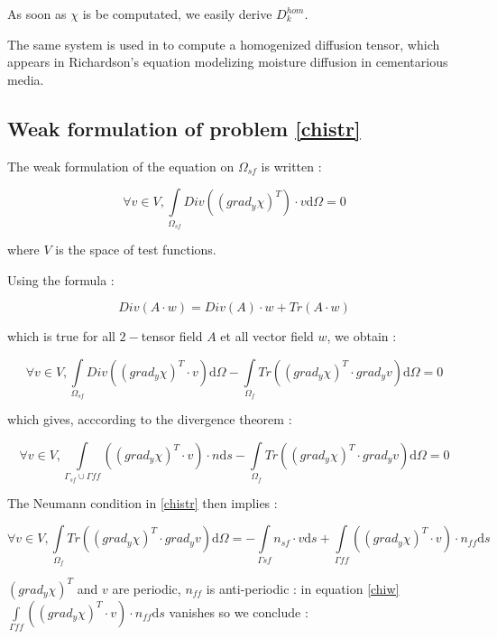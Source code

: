 As soon as $\chi$ is be computated, we easily derive $D_k^{hom}$.

\ligneinter
The same system is used in \cite{WalMill16} to compute a homogenized diffusion tensor, %
which appears in Richardson's equation modelizing moisture diffusion in cementarious media.

\subsection{Weak formulation of problem \ref{chistr}}

The weak formulation of the equation on $\Omega_{sf}$ is written :

\[\forall v \in V , \int\limits_{\Omega_{sf}}Div\left(\left(grad_y \chi\right)^{T}\right)\cdot v\text{d}\Omega=0\]

where $V$ is the space of test functions.

\par
Using the formula :

\[Div(A\cdot w)=Div(A)\cdot w+Tr(A\cdot w)\]

which is true for all $2-$tensor field $A$ et all vector field $w$, we obtain :

\[\forall v \in V , \int\limits_{\Omega_{sf}}Div\left(\left(grad_y \chi\right)^{T}\cdot v\right)\text{d}\Omega-%
\int\limits_{\Omega_f}Tr\left(\left(grad_y\chi\right)^T\cdot grad_y v\right)\text{d}\Omega=0\]

which gives, acccording to the divergence theorem :

\[\forall v \in V , \int\limits_{\Gamma_{sf}\cup\Gamma{ff}}\left(\left(grad_y \chi\right)^{T}\cdot v\right)\cdot n\text{d}s-%
\int\limits_{\Omega_f}Tr\left(\left(grad_y\chi\right)^T\cdot grad_y v\right)\text{d}\Omega=0\]

The Neumann condition in \ref{chistr} then implies :

\begin{equation}\label{chiw}
\forall v \in V , %
\int\limits_{\Omega_f}Tr\left(\left(grad_y\chi\right)^T\cdot grad_y v\right)\text{d}\Omega=%
-\int\limits_{\Gamma{sf}}n_{sf}\cdot v\text{d}s%
+\int\limits_{\Gamma{ff}}\left(\left(grad_y \chi\right)^{T}\cdot v\right)\cdot n_{ff}\text{d}s
\end{equation}

$\left(grad_y \chi\right)^{T}$ and $v$ are periodic, $n_{ff}$ is anti-periodic : %
in equation \ref{chiw} $\displaystyle\int\limits_{\Gamma{ff}}\left(\left(grad_y \chi\right)^{T}\cdot v\right)\cdot n_{ff}\text{d}s$ vanishes so we conclude :

